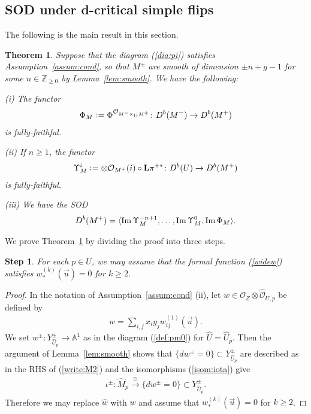 \documentclass[11pt]{amsart}
\theoremstyle{plain}
\newtheorem{thm}{Theorem}[section]
\newtheorem{step}{Step}
\newcommand{\oO}{\mathcal{O}}
\newcommand{\dL}{\mathbf{L}}
\newcommand{\Imm}{\mathop{\rm Im}\nolimits}
\begin{document}
\subsection{SOD under d-critical simple flips}
The following is the main result in this section. 
\begin{thm}\label{thm:main}
Suppose that the diagram (\ref{dia:pi}) satisfies Assumption~\ref{assum:cond}, 
so that $M^{\pm}$ are smooth of dimension 
$\pm n+g-1$ for some $n \in \mathbb{Z}_{\ge 0}$
by Lemma~\ref{lem:smooth}. 
We have the following: 

(i) The functor
\begin{align*}
\Phi_M \cneq \Phi^{\oO_{M^- \times_U M^+}} \colon 
D^b(M^-) \to D^b(M^+)
\end{align*}
is fully-faithful. 

(ii) If $n\ge 1$, the functor
\begin{align*}
\Upsilon_M^i 
\cneq \otimes \oO_{M^+}(i) \circ \dL \pi^{+\ast} \colon 
D^b(U) \to D^b(M^+)
\end{align*}
is fully-faithful. 

(iii) We have the SOD
\begin{align}\label{sod:main}
D^b(M^+)=\langle \Imm \Upsilon_M^{-n+1}, \ldots, 
\Imm \Upsilon_M^0, \Imm \Phi_M   \rangle. 
\end{align}
\end{thm}


We prove Theorem~\ref{thm:main} 
by dividing the proof into three steps. 
\begin{step}
For each $p \in U$, we may assume that the formal function (\ref{widew})
satisfies $w_{\ast}^{(k)}(\vec{u})=0$ for $k\ge 2$. 
\end{step}
\begin{proof}
In the notation of Assumption~\ref{assum:cond} (ii), 
let $w \in \oO_{Z}\otimes \widehat{\oO}_{U, p}$ be 
defined by
\begin{align*}
w=\sum_{i, j} x_i y_j w_{ij}^{(1)}(\vec{u}).
\end{align*}
We set $w^{\pm} \colon Y^{\pm}_{\widehat{U}_p} \to \mathbb{A}^1$
as in the diagram (\ref{def:pm0})
for $\widehat{U}=\widehat{U}_p$. 
Then the argument of Lemma~\ref{lem:smooth}
shows that 
$\{d w^{\pm}=0\} \subset Y_{\widehat{U}_p}^{\pm}$
are described as in the RHS of (\ref{write:M2}) and 
the isomorphisms (\ref{isom:iota}) give
\begin{align*}
\iota^{\pm} \colon 
\widehat{M}_p \stackrel{\cong}{\to}
\{d w^{\pm}=0\} \subset Y_{\widehat{U}_p}^{\pm}.
\end{align*}
Therefore we may replace 
$\widehat{w}$ with $w$ and 
assume that 
$w_{\ast}^{(k)}(\vec{u})=0$ for $k\ge 2$. 
\end{proof}
\end{document}
